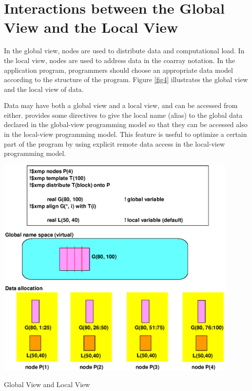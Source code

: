 \section{Interactions between the Global View and the Local View}

In the global view, nodes are used to distribute data and computational
load. In the local view, nodes are used to address data in the coarray
notation.
%
In the application program,
programmers should choose an appropriate data model according to the
structure of the program. Figure \ref{fig4} illustrates the global view
and the local view of data.

Data may have both a global view and a local view, and can be accessed
from either. {\XMP} provides some directives to give the local name
(alias) to the global data declared in the global-view programming model
so that they can be accessed also in the local-view programming
model. This feature is useful to optimize a certain part of the program
by using explicit remote data access in the local-view programming
model.

\begin{myfigure}
\includegraphics[width=12cm]{figs/Fig4.eps}
  \caption{Global View and Local View}
\label{fig4}
\end{myfigure}

